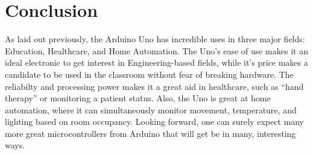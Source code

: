 \documentclass[11pt,letterpaper,twocolumn]{article}
\begin{document}
\section{Conclusion}
As laid out previously, the Arduino Uno has incredible uses in three major fields: Education, Healthcare, and Home Automation. The Uno's ease of use makes it an ideal electronic to get interest in Engineering-based fields, while it's price makes a candidate to be used in the classroom without fear of breaking hardware. The reliabilty and processing power makes it a great aid in healthcare, such as ``hand therapy'' or monitoring a patient status. Also, the Uno is great at home automation, where it can simultaneously monitor movement, temperature, and lighting based on room occupancy. Looking forward, one can surely expect many more great microcontrollers from Arduino that will get be in many, interesting ways.
\end{document}
